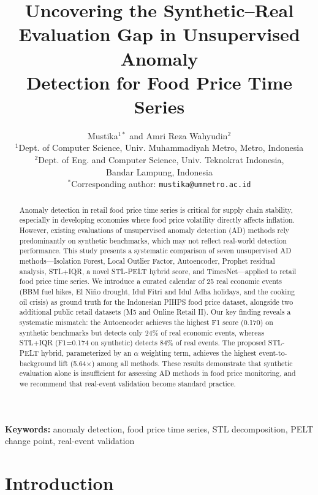 \documentclass[10pt]{article}
\title{Uncovering the Synthetic--Real\\Evaluation Gap in Unsupervised Anomaly\\Detection for Food Price Time Series}
\author{
    Mustika$^{1\ast}$ and Amri Reza Wahyudin$^{2}$ \\
    $^{1}$Dept. of Computer Science, Univ. Muhammadiyah Metro, Metro, Indonesia \\
    $^{2}$Dept. of Eng. and Computer Science, Univ. Teknokrat Indonesia,\\
    \hspace*{2em}Bandar Lampung, Indonesia \\
    $^{\ast}$Corresponding author: \texttt{mustika@ummetro.ac.id}
}
\date{}
\begin{document}
\maketitle

\begin{abstract}
Anomaly detection in retail food price time series is critical for supply chain stability, especially in developing economies where food price volatility directly affects inflation. However, existing evaluations of unsupervised anomaly detection (AD) methods rely predominantly on synthetic benchmarks, which may not reflect real-world detection performance. This study presents a systematic comparison of seven unsupervised AD methods---Isolation Forest, Local Outlier Factor, Autoencoder, Prophet residual analysis, STL+IQR, a novel STL-PELT hybrid score, and TimesNet---applied to retail food price time series. We introduce a curated calendar of 25 real economic events (BBM fuel hikes, El Ni\~no drought, Idul Fitri and Idul Adha holidays, and the cooking oil crisis) as ground truth for the Indonesian PIHPS food price dataset, alongside two additional public retail datasets (M5 and Online Retail II). Our key finding reveals a systematic mismatch: the Autoencoder achieves the highest F1 score (0.170) on synthetic benchmarks but detects only 24\% of real economic events, whereas STL+IQR (F1=0.174 on synthetic) detects 84\% of real events. The proposed STL-PELT hybrid, parameterized by an $\alpha$ weighting term, achieves the highest event-to-background lift (5.64$\times$) among all methods. These results demonstrate that synthetic evaluation alone is insufficient for assessing AD methods in food price monitoring, and we recommend that real-event validation become standard practice.
\end{abstract}

\noindent\textbf{Keywords:} anomaly detection, food price time series, STL decomposition, PELT change point, real-event validation

\section{Introduction}
\label{sec:intro}
\end{document}
